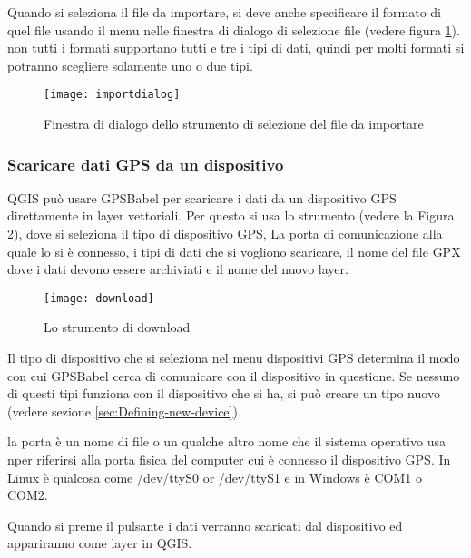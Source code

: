 Quando si seleziona il file da importare, si deve anche specificare il formato di quel file usando il menu nelle finestra di dialogo di selezione file (vedere figura \ref{figure importdialog}). non tutti i formati supportano tutti e tre i tipi di dati, quindi per molti formati si potranno scegliere solamente uno o due tipi.

\begin{figure}[ht]
   \begin{center}
\caption{\label{figure importdialog} Finestra di dialogo dello strumento di selezione del file da importare \nixcaption}
\texttt{[image: importdialog]}
   \end{center}
\end{figure}

\subsubsection{Scaricare dati GPS da un dispositivo}

QGIS può usare GPSBabel per scaricare i dati da un dispositivo GPS direttamente in layer vettoriali.
Per questo si usa lo strumento  (vedere la Figura \ref{figure_download}), dove si seleziona il tipo di dispositivo GPS, La porta di comunicazione alla quale lo si è connesso, i tipi di dati che si vogliono scaricare, il nome del file GPX dove i dati devono essere archiviati e il nome del nuovo layer.

\begin{figure}[ht]
   \begin{center}
\caption{\label{figure_download}Lo strumento di download \nixcaption}
\texttt{[image: download]}
   \end{center}
\end{figure}


Il tipo di dispositivo che si seleziona nel menu dispositivi GPS determina il modo con cui GPSBabel cerca di comunicare con il dispositivo in questione. Se nessuno di questi tipi funziona con il dispositivo che si ha, si può creare un tipo nuovo (vedere sezione \ref{sec:Defining-new-device}).

la porta è un nome di file o un qualche altro nome che il sistema operativo usa nper riferirsi alla porta fisica del computer cui è connesso il dispositivo GPS.
\nix In Linux è qualcosa come /dev/ttyS0 or /dev/ttyS1 e in \win Windows è COM1 o COM2.

Quando si preme il pulsante  i dati verranno scaricati dal dispositivo ed appariranno come layer in QGIS.

